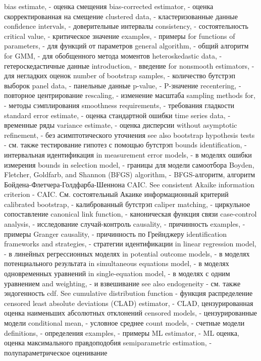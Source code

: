bias estimate, - оценка смещения
bias-corrected estimator, - оценка скорректированная на смещение
clustered data, - кластеризованные данные
confidence intervals, - доверительные интервалы
consistency, - состоятельность
critical value, - критическое значение
examples, - примеры
for functions of parameters, - для функций от параметров
general algorithm, - общий алгоритм
for GMM, - для обобщенного метода моментов
heteroskedastic data, - гетероскедастичные данные
introduction, - введение
for nonsmooth estimators, - для негладких оценок
number of bootstrap samples, - количество бутстрэп выборок
panel data, - панельные данные
p-value, - P-значение
recentering, - повторное центрирование
rescaling, - изменение масштаба
sampling methods for, - методы сэмплирования
smoothness requirements, - требования гладкости
standard error estimate, - оценка стандартной ошибки
time series data, - временные ряды
variance estimate, - оценка дисперсии
without asymptotic refinement, - без асимптотического уточнения
see also bootstrap hypothesis tests - см. также тестирование гипотез с помощью бутстрэп
bounds identification, - интервальная идентификация
in measurement error models, - в моделях ошибки измерения
bounds in selection model, - границы для модели самоотбора
Boyden, Fletcher, Goldfarb, and Shannon (BFGS) algorithm, - BFGS-алгоритм, алгоритм Бойдена-Флетчера-Голдфарба-Шеннона
CAIC. See consistent Akaike information criterion - CAIC. См. состоятельный Акаике информационный критерий
calibrated bootstrap, - калиброванный бутстрэп
caliper matching, - циркульное сопоставление
canonical link function, - каноническая функция связи
case-control analysis, - исследование случай-контроль
causality, - причинность
examples, - примеры
Granger causality, - причинность по Грейнджеру
identification frameworks and strategies, - стратегии идентификации
in linear regression model, - в линейных регрессионных моделях
in potential outcome models, - в моделях потенциального результата
in simultaneous equations model, - в моделях одновременных уравнений
in single-equation model, - в моделях с одним уравнением
and weighting, - и взвешивание
see also endogeneity - см. также эндогенность
cdf. See cumulative distribution function - функция распределение
censored least absolute deviations (CLAD) estimator, - CLAD, цензурированная оценка наименьших абсолютных отклонений
censored models, - цензурированные модели
conditional mean, - условное среднее
count models, - счетные модели
definitions, - определения
examples, - примеры
ML estimator, - ML оценка, оценка максимального правдоподобия
semiparametric estimation, - полупараметрическое оценивание
